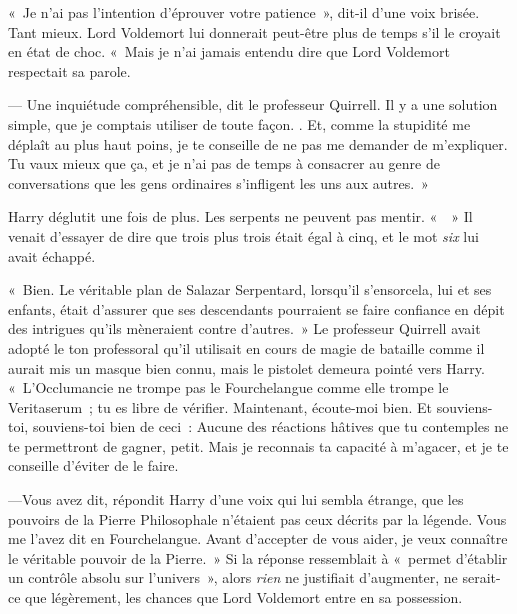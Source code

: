 «~Je n'ai pas l'intention d'éprouver votre patience~», dit-il d'une voix brisée.
Tant mieux.
Lord Voldemort lui donnerait peut-être plus de temps s'il le croyait en état de choc.
«~Mais je n'ai jamais entendu dire que Lord Voldemort respectait sa parole.

--- Une inquiétude compréhensible, dit le professeur Quirrell.
Il y a une solution simple, que je comptais utiliser de toute façon.
.
Et, comme la stupidité me déplaît au plus haut poins, je te conseille de ne pas me demander de m'expliquer.
Tu vaux mieux que ça, et je n'ai pas de temps à consacrer au genre de conversations que les gens ordinaires s'infligent les uns aux autres.~»

Harry déglutit une fois de plus.
Les serpents ne peuvent pas mentir.
«~~» Il venait d'essayer de dire que trois plus trois était égal à cinq, et le mot \emph{six} lui avait échappé.

«~Bien. Le véritable plan de Salazar Serpentard, lorsqu'il s'ensorcela, lui et ses enfants, était d'assurer que ses descendants pourraient se faire confiance en dépit des intrigues qu'ils mèneraient contre d'autres.~»
Le professeur Quirrell avait adopté le ton professoral qu'il utilisait en cours de magie de bataille comme il aurait mis un masque bien connu, mais le pistolet demeura pointé vers Harry.
«~L'Occlumancie ne trompe pas le Fourchelangue comme elle trompe le Veritaserum~; tu es libre de vérifier.
Maintenant, écoute-moi bien.
 Et souviens-toi, souviens-toi bien de ceci~:  Aucune des réactions hâtives que tu contemples ne te permettront de gagner, petit.
Mais je reconnais ta capacité à m'agacer, et je te conseille d'éviter de le faire.

---Vous avez dit, répondit Harry d'une voix qui lui sembla étrange, que les pouvoirs de la Pierre Philosophale n'étaient pas ceux décrits par la légende.
Vous me l'avez dit en Fourchelangue.
Avant d'accepter de vous aider, je veux connaître le véritable pouvoir de la Pierre.~»
Si la réponse ressemblait à «~permet d'établir un contrôle absolu sur l'univers~», alors \emph{rien} ne justifiait d'augmenter, ne serait-ce que légèrement, les chances que Lord Voldemort entre en sa possession.

